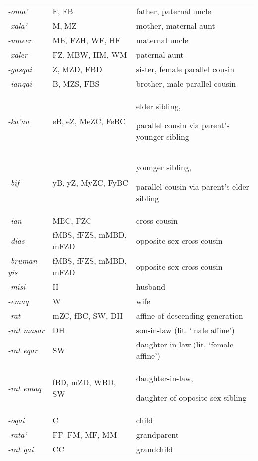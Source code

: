 \begin{center}
\tablehead{}
\begin{supertabular}{m{0.8719598in}m{2.0254598in}m{2.9559598in}}
\textit{{}-oma{\textquoteright}} &
F, FB &
father, paternal uncle\\
\textit{{}-xala{\textquoteright}} &
M, MZ &
mother, maternal aunt\\
\textit{{}-umeer} &
MB, FZH, WF, HF &
maternal uncle\\
\textit{{}-xaler} &
FZ, MBW, HM, WM &
paternal aunt\\
\textit{{}-gasqai} &
Z, MZD, FBD &
sister, female parallel cousin\\
\textit{{}-ianqai} &
B, MZS, FBS &
brother, male parallel cousin\\
\textit{{}-ka{\textquoteright}au} &
eB, eZ, MeZC, FeBC &
elder sibling, 

parallel cousin via parent{\textquoteright}s younger sibling\\
\textit{{}-bif} &
yB, yZ, MyZC, FyBC &
younger sibling, 

parallel cousin via parent{\textquoteright}s elder sibling\\
\textit{{}-ian} &
MBC, FZC &
cross-cousin\\
\textit{{}-dias} &
fMBS, fFZS, mMBD, mFZD &
opposite-sex cross-cousin\\
\textit{{}-bruman yis} &
fMBS, fFZS, mMBD, mFZD &
opposite-sex cross-cousin\\
\textit{{}-misi} &
H &
husband\\
\textit{{}-emaq} &
W &
wife\\
\textit{{}-rat} &
mZC, fBC, SW, DH &
affine of descending generation\\
\textit{{}-rat masar} &
DH &
son-in-law (lit. {\textquoteleft}male affine{\textquoteright})\\
\textit{{}-rat eqar} &
SW &
daughter-in-law (lit. {\textquoteleft}female affine{\textquoteright})\\
\textit{{}-rat emaq} &
fBD, mZD, WBD, SW &
daughter-in-law, 

daughter of opposite-sex sibling\\
\textit{{}-oqai} &
C &
child\\
\textit{{}-rata{\textquoteright}} &
FF, FM, MF, MM &
grandparent\\
\textit{{}-rat qai} &
CC &
grandchild\\
\end{supertabular}
\end{center}
